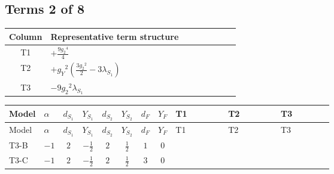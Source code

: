 \documentclass[8pt]{article}
\begin{document}
\begin{landscape}
\subsection*{Terms 2 of 8}
\begin{center}
\begin{tabular}{@{}c >{\raggedright\arraybackslash}p{0.82\linewidth}@{}}
\toprule
Column & Representative term structure \\
\midrule
T1 & \(\displaystyle +\frac{9 {g_2}^4}{4}\) \\
\midrule
T2 & \(\displaystyle +{g_Y}^2 \left(\frac{3 {g_2}^2}{2}-3 {\lambda_{S_1}}\right)\) \\
\midrule
T3 & \(\displaystyle -9 {g_2}^2 {\lambda_{S_1}}\) \\
\midrule
\bottomrule
\end{tabular}
\end{center}
\smallskip
\tiny
\begin{longtable}{@{}llcccccc >{\raggedright\arraybackslash}p{0.21\linewidth} >{\raggedright\arraybackslash}p{0.21\linewidth} >{\raggedright\arraybackslash}p{0.21\linewidth}@{}}
\toprule
Model & $\alpha$ & $d_{S_1}$ & $Y_{S_1}$ & $d_{S_2}$ & $Y_{S_2}$ & $d_F$ & $Y_F$ & T1 & T2 & T3 \\
\midrule
\endfirsthead
\toprule
Model & $\alpha$ & $d_{S_1}$ & $Y_{S_1}$ & $d_{S_2}$ & $Y_{S_2}$ & $d_F$ & $Y_F$ & T1 & T2 & T3 \\
\midrule
\endhead
T3-B & $-1$ & $2$ & $-\frac{1}{2}$ & $2$ & $\frac{1}{2}$ & $1$ & $0$ & \scriptsize\adjustbox{max width=\linewidth}{$\begin{gathered} +\frac{9 {g_2}^4}{4}\end{gathered}$} & \scriptsize\adjustbox{max width=\linewidth}{$\begin{gathered} +{g_Y}^2 \left(\frac{3 {g_2}^2}{2}-3 {\lambda_{S_1}}\right)\end{gathered}$} & \scriptsize\adjustbox{max width=\linewidth}{$\begin{gathered} -9 {g_2}^2 {\lambda_{S_1}}\end{gathered}$} \\
\midrule
T3-C & $-1$ & $2$ & $-\frac{1}{2}$ & $2$ & $\frac{1}{2}$ & $3$ & $0$ & \scriptsize\adjustbox{max width=\linewidth}{$\begin{gathered} +\frac{9 {g_2}^4}{4}\end{gathered}$} & \scriptsize\adjustbox{max width=\linewidth}{$\begin{gathered} +{g_Y}^2 \left(\frac{3 {g_2}^2}{2}-3 {\lambda_{S_1}}\right)\end{gathered}$} & \scriptsize\adjustbox{max width=\linewidth}{$\begin{gathered} -9 {g_2}^2 {\lambda_{S_1}}\end{gathered}$} \\

\end{longtable}
\end{landscape}
\end{document}
